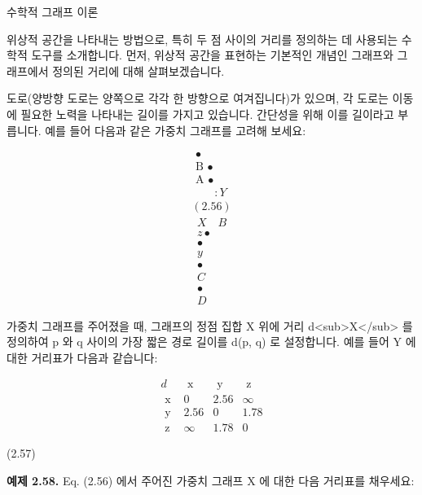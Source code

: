 \documentclass[11pt, a4paper, twoside, openany]{book}
\begin{document}
{\par\medskip
수학적 그래프 이론

\par\medskip
위상적 공간을 나타내는 방법으로, 특히 두 점 사이의 거리를 정의하는 데 사용되는 수학적 도구를 소개합니다. 먼저, 위상적 공간을 표현하는 기본적인 개념인 그래프와 그래프에서 정의된 거리에 대해 살펴보겠습니다.

\par\medskip
도로(양방향 도로는 양쪽으로 각각 한 방향으로 여겨집니다)가 있으며, 각 도로는 이동에 필요한 노력을 나타내는 길이를 가지고 있습니다. 간단성을 위해 이를 길이라고 부릅니다. 예를 들어 다음과 같은 가중치 그래프를 고려해 보세요:

\par\medskip
$$
\begin{array}{c}
\text { • } \\
\text { B } \bullet \\
\text { A } \bullet \\
\qquad : Y \\
(2.56)
\end{array}
$$
$$
\begin{array}{c}
X \quad B \\
z \bullet \\
\bullet \\
y \\
\bullet \\
C \\
\bullet \\
D
\end{array}
$$

\par\medskip
가중치 그래프를 주어졌을 때, 그래프의 정점 집합 X 위에 거리 d<sub>X</sub> 를 정의하여 p 와 q 사이의 가장 짧은 경로 길이를 d(p, q) 로 설정합니다. 예를 들어 Y 에 대한 거리표가 다음과 같습니다:

\par\medskip
$$
\begin{array}{c|ccc}
d & \text { x } & \text { y } & \text { z } \\
\hline
\text { x } & 0 & 2.56 & \infty \\
\text { y } & 2.56 & 0 & 1.78 \\
\text { z } & \infty & 1.78 & 0
\end{array}
$$

\par\medskip
(2.57)

\par\medskip
\textbf{예제 2.58.}  Eq. (2.56) 에서 주어진 가중치 그래프 X 에 대한 다음 거리표를 채우세요:

}
\end{document}
